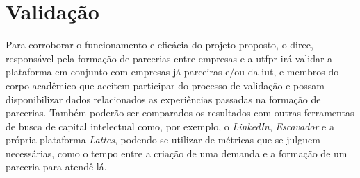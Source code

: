 \section{Validação}\label{sec:validacao}

Para corroborar o funcionamento e eficácia do projeto proposto, o \gls{direc}, responsável pela formação de parcerias entre empresas e a \gls{utfpr} irá validar a plataforma em conjunto com empresas já parceiras e/ou da \gls{iut}, e membros do corpo acadêmico que aceitem participar do processo de validação e possam disponibilizar dados relacionados as experiências passadas na formação de parcerias. Também poderão ser comparados os resultados com outras ferramentas de busca de capital intelectual como, por exemplo, o \textit{LinkedIn}, \textit{Escavador} e a própria plataforma \textit{Lattes}, podendo-se utilizar de métricas que se julguem necessárias, como o tempo entre a criação de uma demanda e a formação de um parceria para atendê-lá.
